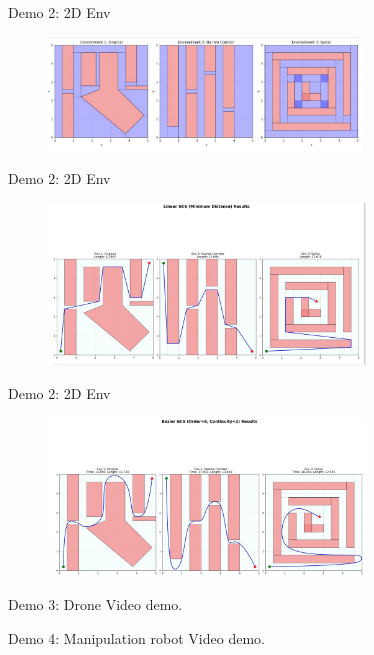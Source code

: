 \documentclass[aspectratio=169]{beamer}
\begin{document}
\begin{frame}{Demo 2: 2D Env}
    \begin{figure}
        \centering
        \includegraphics[width=0.75\textwidth]{../imgs/3env-2d.png}
        \caption{}
    \end{figure}
\end{frame}

\begin{frame}{Demo 2: 2D Env}
    \begin{figure}
        \centering
        \includegraphics[width=0.75\textwidth]{../imgs/3env-2d-min-dis.png}
        \caption{}
    \end{figure}
\end{frame}

\begin{frame}{Demo 2: 2D Env}
    \begin{figure}
        \centering
        \includegraphics[width=0.75\textwidth]{../imgs/3env-2d-min-time.png}
        \caption{}
    \end{figure}
\end{frame}

\begin{frame}{Demo 3: Drone}
    Video demo.
\end{frame}

\begin{frame}{Demo 4: Manipulation robot}
    Video demo.
\end{frame}
\end{document}

